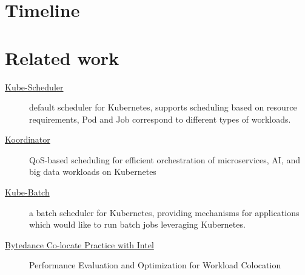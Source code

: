 \documentclass[pdftex,twocolumn,10pt,letterpaper]{article}
\begin{document}
\section*{Timeline}


\section*{Related work}
\begin{description}
	\item [\href{https://kubernetes.io/docs/concepts/scheduling-eviction/kube-scheduler/}{Kube-Scheduler}] default scheduler for Kubernetes, supports scheduling based on resource requirements, Pod and Job correspond to different types of workloads.
	\item [\href{https://koordinator.sh}{Koordinator}] QoS-based scheduling for efficient orchestration of microservices, AI, and big data workloads on Kubernetes\cite{koo}
	\item [\href{https://github.com/kubernetes-retired/kube-batch}{Kube-Batch}] a batch scheduler for Kubernetes, providing mechanisms for applications which would like to run batch jobs leveraging Kubernetes.
	\item [\href{https://www.intel.com.br/content/dam/www/public/us/en/documents/white-papers/Intel_ByteDance_WhitePaper.pdf}{Bytedance Co-locate Practice with Intel}] Performance Evaluation and Optimization for Workload Colocation\cite{:aa}
\end{description}

{


}
\end{document}
